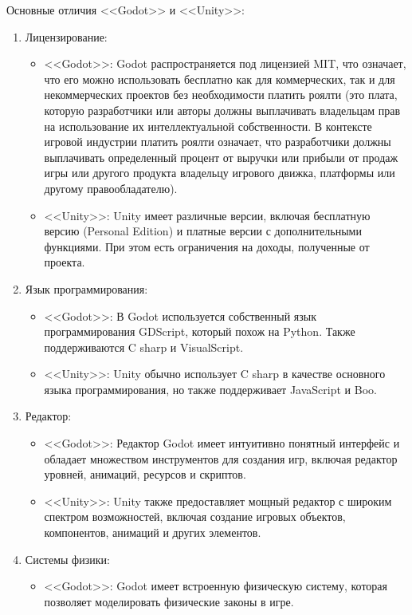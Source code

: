 Основные отличия <<Godot>> и <<Unity>>:
\begin{enumerate}
\item Лицензирование:
    \begin{itemize}
        \item <<Godot>>: Godot распространяется под лицензией MIT, что означает, что его можно использовать бесплатно как для коммерческих, так и для некоммерческих проектов без необходимости платить роялти (это плата, которую разработчики или авторы должны выплачивать владельцам прав на использование их интеллектуальной собственности. В контексте игровой индустрии платить роялти означает, что разработчики должны выплачивать определенный процент от выручки или прибыли от продаж игры или другого продукта владельцу игрового движка, платформы или другому правообладателю).
        \item <<Unity>>: Unity имеет различные версии, включая бесплатную версию (Personal Edition) и платные версии с дополнительными функциями. При этом есть ограничения на доходы, полученные от проекта.
    \end{itemize}
\item Язык программирования:
    \begin{itemize}
        \item <<Godot>>: В Godot используется собственный язык программирования GDScript, который похож на Python. Также поддерживаются C sharp и VisualScript.
        \item <<Unity>>: Unity обычно использует C sharp в качестве основного языка программирования, но также поддерживает JavaScript и Boo.
    \end{itemize}
\item Редактор:
    \begin{itemize}
        \item <<Godot>>: Редактор Godot имеет интуитивно понятный интерфейс и обладает множеством инструментов для создания игр, включая редактор уровней, анимаций, ресурсов и скриптов.
        \item <<Unity>>: Unity также предоставляет мощный редактор с широким спектром возможностей, включая создание игровых объектов, компонентов, анимаций и других элементов.
    \end{itemize}
\item Системы физики:
    \begin{itemize}
        \item <<Godot>>: Godot имеет встроенную физическую систему, которая позволяет моделировать физические законы в игре.

\end{itemize}
\end{enumerate}
